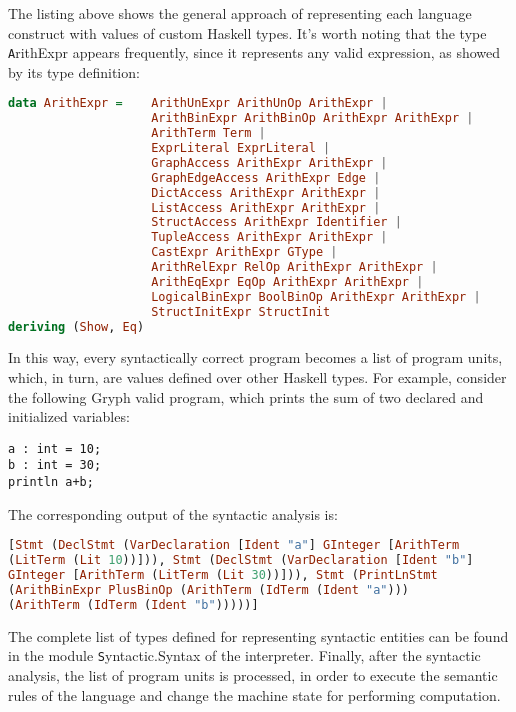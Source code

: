 The listing above shows the general approach of representing each
language construct with values of custom Haskell types.
It's worth noting that the type {\texttt ArithExpr}
appears frequently, since it represents any valid expression, as 
showed by its type definition:

\begin{lstlisting}[language=Haskell,basicstyle=\footnotesize]
data ArithExpr =    ArithUnExpr ArithUnOp ArithExpr | 
                    ArithBinExpr ArithBinOp ArithExpr ArithExpr | 
                    ArithTerm Term |
                    ExprLiteral ExprLiteral |
                    GraphAccess ArithExpr ArithExpr |
                    GraphEdgeAccess ArithExpr Edge |
                    DictAccess ArithExpr ArithExpr |
                    ListAccess ArithExpr ArithExpr |
                    StructAccess ArithExpr Identifier |
                    TupleAccess ArithExpr ArithExpr |
                    CastExpr ArithExpr GType |
                    ArithRelExpr RelOp ArithExpr ArithExpr |
                    ArithEqExpr EqOp ArithExpr ArithExpr |
                    LogicalBinExpr BoolBinOp ArithExpr ArithExpr |
                    StructInitExpr StructInit
deriving (Show, Eq)
\end{lstlisting}

In this way, every syntactically correct program becomes a list
of program units, which, in turn, are values defined over other
Haskell types. For example, consider the following Gryph valid program,
which prints the sum of two declared and initialized variables:

\begin{lstlisting}[language=Gryph]
a : int = 10;
b : int = 30;
println a+b;
\end{lstlisting}

The corresponding output of the syntactic analysis is:

\begin{lstlisting}[language=Haskell,basicstyle=\scriptsize]
[Stmt (DeclStmt (VarDeclaration [Ident "a"] GInteger [ArithTerm 
(LitTerm (Lit 10))])), Stmt (DeclStmt (VarDeclaration [Ident "b"] 
GInteger [ArithTerm (LitTerm (Lit 30))])), Stmt (PrintLnStmt 
(ArithBinExpr PlusBinOp (ArithTerm (IdTerm (Ident "a"))) 
(ArithTerm (IdTerm (Ident "b")))))]
\end{lstlisting}

The complete list of types defined for representing syntactic
entities can be found in the module {\texttt Syntactic.Syntax}
of the interpreter. Finally, after the syntactic analysis, the list of program units
is processed, in order to execute the semantic rules
of the language and change the machine state for performing
computation. 

